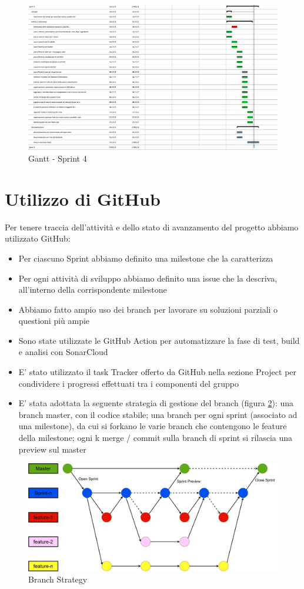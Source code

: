 \documentclass[a4paper,12pt]{report}
\begin{document}
	\begin{figure}[!h]
		\centering
		\includegraphics[width=0.9\linewidth]{image/scrum4.png}
		\caption{Gantt - Sprint 4}\label{fig:scrum4}
	\end{figure}

    	\section{Utilizzo di GitHub}
Per tenere traccia dell'attività e dello stato di avanzamento del progetto abbiamo utilizzato GitHub:
\begin{itemize}
		\item Per ciascuno Sprint abbiamo definito una milestone che la caratterizza
		\item Per ogni attività di sviluppo abbiamo definito una issue che la descriva, all'interno della corrispondente milestone
		\item Abbiamo fatto ampio uso dei branch per lavorare su soluzioni parziali o questioni più ampie
		\item Sono state utilizzate le GitHub Action per automatizzare la fase di test, build e analisi con SonarCloud
		\item E' stato utilizzato il task Tracker offerto da GitHub nella sezione Project per condividere i progressi effettuati tra i componenti del gruppo
		\item E' stata adottata la seguente strategia di gestione del branch (figura \ref{fig:branchStrategy}): una branch master, con il codice stabile; una branch per ogni sprint (associato ad una milestone), da cui si forkano le varie branch che contengono le feature della milestone; ogni k merge / commit sulla branch di sprint si rilascia una preview sul master
	\end{itemize}

	\begin{figure}[!h]
		\centering
		\includegraphics[width=0.9\linewidth]{image/branchStrategy.png}
		\caption{Branch Strategy}\label{fig:branchStrategy}
	\end{figure}
	
\end{document}
